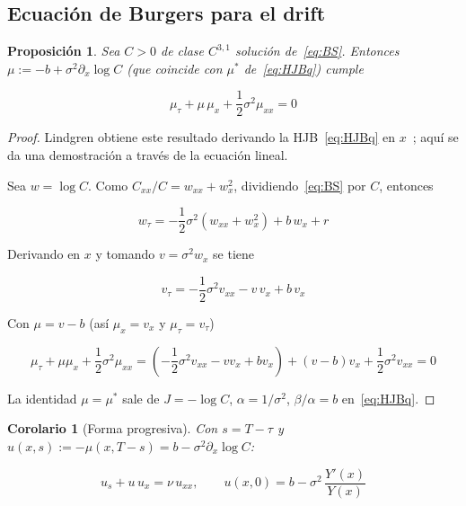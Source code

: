 \documentclass[11pt,letterpaper]{article}
\theoremstyle{plain}
\newtheorem{proposicion}[theorem]{Proposición}
\newtheorem{corolario}[theorem]{Corolario}
\theoremstyle{definition}
\theoremstyle{remark}
\numberwithin{equation}{section}
\begin{document}
	\subsection{Ecuación de Burgers para el drift}\label{subsec:burgers}
	
	\begin{proposicion}\label{prop:burgers}
		Sea \(C>0\) de clase \(C^{3,1}\) solución de~\eqref{eq:BS}. Entonces \(\mu:=-b+\sigma^2\partial_x\log C\) (que coincide con \(\mu^\ast\) de~\eqref{eq:HJBq}) cumple
		
		\begin{equation}\label{eq:burgersb}
			\mu_\tau+\mu\,\mu_x+\frac12\sigma^2\mu_{xx}=0
		\end{equation}
	\end{proposicion}
	
	\begin{proof}
		Lindgren obtiene este resultado derivando la HJB~\eqref{eq:HJBq} en \(x\)~\cite[ec.~(19)--(20)]{Lindgren2020}; aquí se da una demostración a través de la ecuación lineal.
		
		Sea \(w=\log C\). Como \(C_{xx}/C=w_{xx}+w_x^2\), dividiendo~\eqref{eq:BS} por \(C\), entonces
		
		\[
		w_\tau=-\frac12\sigma^2(w_{xx}+w_x^2)+b\,w_x+r
		\]
		
		Derivando en \(x\) y tomando \(v=\sigma^2w_x\) se tiene
		
		\[
		v_\tau=-\frac12\sigma^2v_{xx}-v\,v_x+b\,v_x
		\]
		
		Con \(\mu=v-b\) (así \(\mu_x=v_x\) y \(\mu_\tau=v_\tau\))
		
		\[
		\mu_\tau+\mu\mu_x+\frac12\sigma^2\mu_{xx} =\left(-\frac12\sigma^2v_{xx}-vv_x+bv_x\right)+(v-b)v_x+\frac12\sigma^2v_{xx}=0
		\]
		
		La identidad \(\mu=\mu^\ast\) sale de \(J=-\log C\), \(\alpha=1/\sigma^2\), \(\beta/\alpha=b\) en~\eqref{eq:HJBq}.
		
	\end{proof}
	
	
	
	\begin{corolario}[Forma progresiva]\label{cor:fwd}
		Con \(s=T-\tau\) y \(u(x,s):=-\mu(x,T-s)=b-\sigma^2\partial_x\log C\):
		
		\begin{equation}\label{eq:burgers}
			u_s+u\,u_x=\nu\,u_{xx},\qquad u(x,0)=b-\sigma^2\,\frac{Y'(x)}{Y(x)}
		\end{equation}
	\end{corolario}
	
\end{document}
